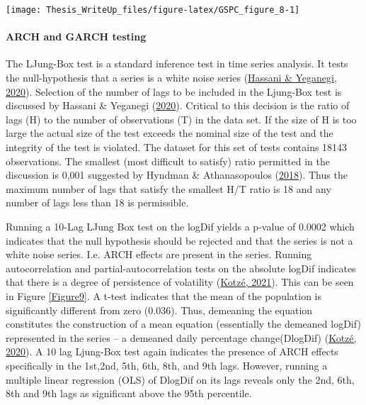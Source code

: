 \documentclass[11pt,preprint, authoryear]{elsarticle}
\let\origfigure\figure
\let\endorigfigure\endfigure
\renewenvironment{figure}[1][2] {
    \expandafter\origfigure\expandafter[H]
} {
    \endorigfigure
}
\numberwithin{equation}{section}
\numberwithin{figure}{section}
\numberwithin{table}{section}
\begin{document}
\begin{figure}[H]

{\centering \texttt{[image: Thesis\_WriteUp\_files/figure-latex/GSPC\_figure\_8-1]} 

}

\caption{stdVolControlled and absolute LogDiff \label{Figure8}}\label{fig:GSPC_figure_8}
\end{figure}

\hypertarget{arch-and-garch-testing}{%
\paragraph{\texorpdfstring{ARCH and GARCH testing
\label{ARCHandGARCH}}{ARCH and GARCH testing }}\label{arch-and-garch-testing}}

The LJung-Box test is a standard inference test in time series analysis.
It tests the null-hypothesis that a series is a white noise series
(\protect\hyperlink{ref-hassani2020selecting}{Hassani \& Yeganegi,
2020}). Selection of the number of lags to be included in the Ljung-Box
test is discussed by Hassani \& Yeganegi
(\protect\hyperlink{ref-hassani2020selecting}{2020}). Critical to this
decision is the ratio of lags (H) to the number of observations (T) in
the data set. If the size of H is too large the actual size of the test
exceeds the nominal size of the test and the integrity of the test is
violated. The dataset for this set of tests contains 18143 observations.
The smallest (most difficult to satisfy) ratio permitted in the
discussion is 0,001 suggested by Hyndman \& Athanasopoulos
(\protect\hyperlink{ref-hyndman2018forecasting}{2018}). Thus the maximum
number of lags that satisfy the smallest H/T ratio is 18 and any number
of lags less than 18 is permissible.

Running a 10-Lag LJung Box test on the logDif yields a p-value of 0.0002
which indicates that the null hypothesis should be rejected and that the
series is not a white noise series. I.e. ARCH effects are present in the
series. Running autocorrelation and partial-autocorrelation tests on the
absolute logDif indicates that there is a degree of persistence of
volatility (\protect\hyperlink{ref-kotze2021volatility}{Kotzé, 2021}).
This can be seen in Figure \ref{Figure9}. A t-test indicates that the
mean of the population is significantly different from zero (0.036).
Thus, demeaning the equation constitutes the construction of a mean
equation (essentially the demeaned logDif) represented in the series --
a demeaned daily percentage change(DlogDif)
(\protect\hyperlink{ref-kotze2020univariate}{Kotzé, 2020}). A 10 lag
Ljung-Box test again indicates the presence of ARCH effects specifically
in the 1st,2nd, 5th, 6th, 8th, and 9th lags. However, running a multiple
linear regression (OLS) of DlogDif on its lags reveals only the 2nd,
6th, 8th and 9th lags as significant above the 95th percentile.
\end{document}

